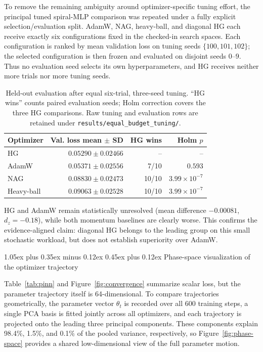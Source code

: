 \documentclass[10pt,twocolumn]{article}
\makeatletter
\renewcommand\subsection{\@startsection{subsection}{2}{0pt}%
  {1.05ex plus 0.35ex minus 0.12ex}%
  {0.45ex plus 0.12ex}%
  {\normalsize\bfseries}}
\makeatother
\begin{document}
To remove the remaining ambiguity around optimizer-specific tuning effort,
the principal tuned spiral-MLP comparison was repeated under a fully explicit
selection/evaluation split. AdamW, NAG, heavy-ball, and diagonal HG each
receive exactly six configurations fixed in the checked-in search spaces.
Each configuration is ranked by mean validation loss on tuning seeds
$\{100,101,102\}$; the selected configuration is then frozen and evaluated
on disjoint seeds $0$--$9$. Thus no evaluation seed selects its own
hyperparameters, and HG receives neither more trials nor more tuning seeds.

\begin{table}[t]
\centering\small
\begin{tabular}{@{}lrrr@{}}
\toprule
Optimizer & Val. loss mean $\pm$ SD & HG wins & Holm $p$ \\
\midrule
HG & $0.05290\pm0.02466$ & -- & -- \\
AdamW & $0.05371\pm0.02556$ & 7/10 & $0.593$ \\
NAG & $0.08830\pm0.02473$ & 10/10 & $3.99\times10^{-7}$ \\
Heavy-ball & $0.09063\pm0.02528$ & 10/10 & $3.99\times10^{-7}$ \\
\bottomrule
\end{tabular}
\caption{Held-out evaluation after equal six-trial, three-seed tuning.
``HG wins'' counts paired evaluation seeds; Holm correction covers the three
HG comparisons. Raw tuning and evaluation rows are retained under
\texttt{results/equal\_budget\_tuning/}.}
\label{tab:equal-budget-tuning}
\end{table}

HG and AdamW remain statistically unresolved (mean difference $-0.00081$,
$d_z=-0.18$), while both momentum baselines are clearly worse. This confirms
the evidence-aligned claim: diagonal HG belongs to the leading group on this
small stochastic workload, but does not establish superiority over AdamW.

\subsection{Phase-space visualization of the optimizer trajectory}
\label{sec:phase-space}

Table~\ref{tab:pinn} and Figure~\ref{fig:convergence} summarize scalar loss,
but the parameter trajectory itself is 64-dimensional. To compare trajectories
geometrically, the parameter vector $\theta_t$ is recorded over all 600
training steps, a single PCA basis is fitted jointly across all optimizers,
and each trajectory is projected onto the leading three principal components.
These components explain 98.4\%, 1.5\%, and 0.1\% of the pooled variance,
respectively, so Figure~\ref{fig:phase-space} provides a shared low-dimensional
view of the full parameter motion.
\end{document}
